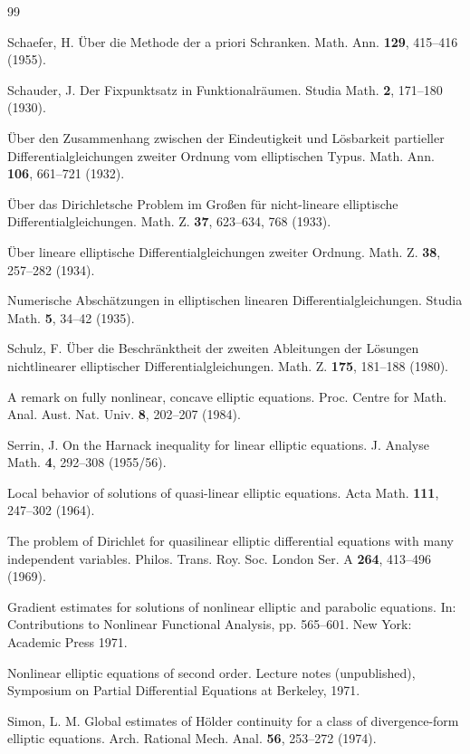 \begin{thebibliography}{99}

Schaefer, H.
Über die Methode der a priori Schranken. Math. Ann. \textbf{129}, 415--416 (1955).

Schauder, J.
Der Fixpunktsatz in Funktionalräumen. Studia Math. \textbf{2}, 171--180 (1930).

Über den Zusammenhang zwischen der Eindeutigkeit und Lösbarkeit partieller Differentialgleichungen zweiter Ordnung vom elliptischen Typus. Math. Ann. \textbf{106}, 661--721 (1932).

Über das Dirichletsche Problem im Großen für nicht-lineare elliptische Differentialgleichungen. Math. Z. \textbf{37}, 623--634, 768 (1933).

Über lineare elliptische Differentialgleichungen zweiter Ordnung. Math. Z. \textbf{38}, 257--282 (1934).

Numerische Abschätzungen in elliptischen linearen Differentialgleichungen. Studia Math. \textbf{5}, 34--42 (1935).

Schulz, F.
Über die Beschränktheit der zweiten Ableitungen der Lösungen nichtlinearer elliptischer Differentialgleichungen. Math. Z. \textbf{175}, 181--188 (1980).

A remark on fully nonlinear, concave elliptic equations. Proc. Centre for Math. Anal. Aust. Nat. Univ. \textbf{8}, 202--207 (1984).

Serrin, J.
On the Harnack inequality for linear elliptic equations. J. Analyse Math. \textbf{4}, 292--308 (1955/56).

Local behavior of solutions of quasi-linear elliptic equations. Acta Math. \textbf{111}, 247--302 (1964).

The problem of Dirichlet for quasilinear elliptic differential equations with many independent variables. Philos. Trans. Roy. Soc. London Ser. A \textbf{264}, 413--496 (1969).

Gradient estimates for solutions of nonlinear elliptic and parabolic equations. In: Contributions to Nonlinear Functional Analysis, pp. 565--601. New York: Academic Press 1971.

Nonlinear elliptic equations of second order. Lecture notes (unpublished), Symposium on Partial Differential Equations at Berkeley, 1971.

Simon, L. M.
Global estimates of Hölder continuity for a class of divergence-form elliptic equations. Arch. Rational Mech. Anal. \textbf{56}, 253--272 (1974).


\end{thebibliography}
